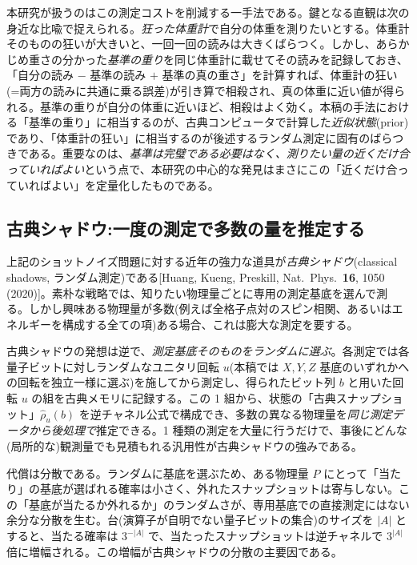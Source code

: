 \documentclass[11pt,a4paper]{ltjsarticle}
\begin{document}
本研究が扱うのはこの測定コストを削減する一手法である。鍵となる直観は次の身近な比喩で捉えられる。\emph{狂った体重計}で自分の体重を測りたいとする。体重計そのものの狂いが大きいと、一回一回の読みは大きくばらつく。しかし、あらかじめ重さの分かった\emph{基準の重り}を同じ体重計に載せてその読みを記録しておき、「自分の読み $-$ 基準の読み $+$ 基準の真の重さ」を計算すれば、体重計の狂い(=両方の読みに共通に乗る誤差)が引き算で相殺され、真の体重に近い値が得られる。基準の重りが自分の体重に近いほど、相殺はよく効く。本稿の手法における「基準の重り」に相当するのが、古典コンピュータで計算した\emph{近似状態}(prior)であり、「体重計の狂い」に相当するのが後述するランダム測定に固有のばらつきである。重要なのは、\emph{基準は完璧である必要はなく、測りたい量の近くだけ合っていればよい}という点で、本研究の中心的な発見はまさにこの「近くだけ合っていればよい」を定量化したものである。

\subsection{古典シャドウ:一度の測定で多数の量を推定する}
\label{sec:shadow}
上記のショットノイズ問題に対する近年の強力な道具が\emph{古典シャドウ}(classical shadows, ランダム測定)である[Huang, Kueng, Preskill, Nat.\ Phys.\ \textbf{16}, 1050 (2020)]。素朴な戦略では、知りたい物理量ごとに専用の測定基底を選んで測る。しかし興味ある物理量が多数(例えば全格子点対のスピン相関、あるいはエネルギーを構成する全ての項)ある場合、これは膨大な測定を要する。

古典シャドウの発想は逆で、\emph{測定基底そのものをランダムに選ぶ}。各測定では各量子ビットに対しランダムなユニタリ回転 $u$(本稿では $X,Y,Z$ 基底のいずれかへの回転を独立一様に選ぶ)を施してから測定し、得られたビット列 $b$ と用いた回転 $u$ の組を古典メモリに記録する。この 1 組から、状態の「古典スナップショット」$\hat\rho_u(b)$ を逆チャネル公式で構成でき、多数の異なる物理量を\emph{同じ測定データから後処理で}推定できる。1 種類の測定を大量に行うだけで、事後にどんな(局所的な)観測量でも見積もれる汎用性が古典シャドウの強みである。

代償は分散である。ランダムに基底を選ぶため、ある物理量 $P$ にとって「当たり」の基底が選ばれる確率は小さく、外れたスナップショットは寄与しない。この「基底が当たるか外れるか」のランダムさが、専用基底での直接測定にはない余分な分散を生む。台(演算子が自明でない量子ビットの集合)のサイズを $|A|$ とすると、当たる確率は $3^{-|A|}$ で、当たったスナップショットは逆チャネルで $3^{|A|}$ 倍に増幅される。この増幅が古典シャドウの分散の主要因である。
\end{document}
